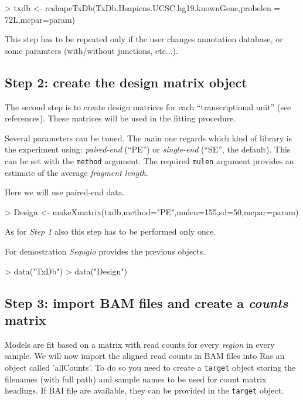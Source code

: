 \documentclass[10pt]{article}
\newcommand{\Robject}[1]{{\texttt{#1}}}
\newcommand{\Rpackage}[1]{{\textit{#1}}}
\newcommand{\Rfunarg}[1]{{\texttt{#1}}}
\newcommand{\software}[1]{\textsf{#1}}
\newcommand{\R}{\software{R}}
\newcommand{\Sequgio}{\Rpackage{Sequgio}}
\begin{document}
\begin{Schunk}
\begin{Sinput}
> txdb <- reshapeTxDb(TxDb.Hsapiens.UCSC.hg19.knownGene,probelen = 72L,mcpar=param)
\end{Sinput}
\end{Schunk}

This step has to be repeated only if the user changes annotation database, or
some paramters (with/without junctions, etc...).


\subsection{Step 2: create the design matrix object}
\label{sec:design}

The second step is to create design matrices for each ``transcriptional unit''
(see references). These matrices will be used in the fitting procedure.

Several parameters can be tuned. The main one regards which kind of library is
the experiment using: \textit{paired-end} (``PE'') or \textit{single-end}
(``SE'', the default). This can be set with the \Rfunarg{method} argument. The
required \Rfunarg{mulen} argument provides an estimate of the average
\textit{fragment length}.

Here we will use paired-end data.

\begin{Schunk}
\begin{Sinput}
> Design <- makeXmatrix(txdb,method="PE",mulen=155,sd=50,mcpar=param)
\end{Sinput}
\end{Schunk}


As for \textit{Step 1} also this step has to be performed only
once.

For demostration \Sequgio{} provides the previous objects.

\begin{Schunk}
\begin{Sinput}
> data("TxDb")
> data("Design")
\end{Sinput}
\end{Schunk}

\subsection{Step 3: import BAM files and create a \textit{counts} matrix}
\label{sec:counts}

Models are fit based on a matrix with read counts for every \textit{region} in every sample.
We will now import the aligned read counts in BAM files into \R as an object called
'allCounts'. To do so you need to create a \Robject{target} object storing the
filenames (with full path) and sample names to be used for count matrix
headings. If BAI file are available, they can be provided in
the \Robject{target} object.
\end{document}
